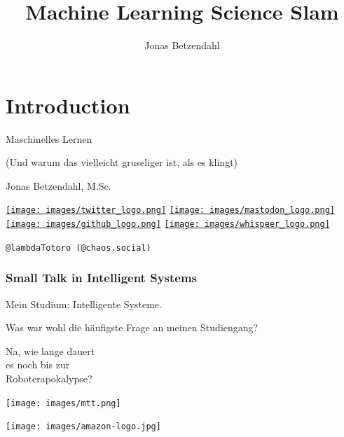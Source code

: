 \documentclass[aspectratio=169,x11names]{beamer}
\author{Jonas Betzendahl}
\title{Machine Learning Science Slam}
\begin{document}
\section{Introduction}

\begin{frame}
\begin{center}
\vfill
\huge Maschinelles Lernen
\normalsize 

(Und warum das vielleicht gruseliger ist, als es klingt)
\bigskip\bigskip

\large Jonas Betzendahl, M.Sc.
\bigskip\bigskip

\href{https://twitter.com/lambdatotoro}{\texttt{[image: images/twitter\_logo.png]}}
\href{https://chaos.social/@lambdatotoro}{\texttt{[image: images/mastodon\_logo.png]}}
\href{https://github.com/lambdaTotoro}{\texttt{[image: images/github\_logo.png]}}
\href{https://whispeer.de/en/user/jbetzend}{\texttt{[image: images/whispeer\_logo.png]}}

\texttt{@lambdaTotoro (@chaos.social)}
\end{center}
\end{frame}



\begin{frame}
\frametitle{Small Talk in Intelligent Systems}

\begin{multicols}{2}

Mein Studium: \glqq Intelligente Systeme\grqq .

Was war wohl die häufigste Frage an meinen Studiengang?

\pause

\begin{center}
\glqq Na, wie lange dauert\\ es noch bis zur\\ Roboterapokalypse?\grqq
\end{center}

\columnbreak

\begin{center}
\texttt{[image: images/mtt.png]} 
\end{center}
\end{multicols}
\end{frame}

\begin{frame}
\begin{center}
\texttt{[image: images/amazon-logo.jpg]} 
\end{center}
\end{frame}
\end{document}
